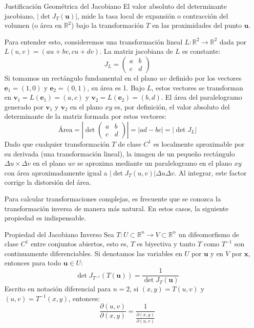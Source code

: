\documentclass[11pt,a4paper]{article}
\begin{document}
\begin{observacionbox}{Justificación Geométrica del Jacobiano}
El valor absoluto del determinante jacobiano, $|\det J_T(\mathbf{u})|$, mide la tasa local de expansión o contracción del volumen (o área en $\mathbb{R}^2$) bajo la transformación $T$ en las proximidades del punto $\mathbf{u}$.

Para entender esto, consideremos una transformación lineal $L: \mathbb{R}^2 \to \mathbb{R}^2$ dada por $L(u,v) = (au+bv, cu+dv)$. La matriz jacobiana de $L$ es constante:
\begin{equation*}
J_L = \begin{pmatrix} a & b \\ c & d \end{pmatrix}
\end{equation*}
Si tomamos un rectángulo fundamental en el plano $uv$ definido por los vectores $\mathbf{e}_1 = (1,0)$ y $\mathbf{e}_2 = (0,1)$, su área es 1. Bajo $L$, estos vectores se transforman en $\mathbf{v}_1 = L(\mathbf{e}_1) = (a,c)$ y $\mathbf{v}_2 = L(\mathbf{e}_2) = (b,d)$. El área del paralelogramo generado por $\mathbf{v}_1$ y $\mathbf{v}_2$ en el plano $xy$ es, por definición, el valor absoluto del determinante de la matriz formada por estos vectores:
\begin{equation*}
\text{Área} = \left| \det \begin{pmatrix} a & b \\ c & d \end{pmatrix} \right| = |ad - bc| = |\det J_L|
\end{equation*}
Dado que cualquier transformación $T$ de clase $C^1$ es localmente aproximable por su derivada (una transformación lineal), la imagen de un pequeño rectángulo $\Delta u \times \Delta v$ en el plano $uv$ se aproxima mediante un paralelogramo en el plano $xy$ con área aproximadamente igual a $|\det J_T(u,v)| \Delta u \Delta v$. Al integrar, este factor corrige la distorsión del área.
\end{observacionbox}

Para calcular transformaciones complejas, es frecuente que se conozca la transformación inversa de manera más natural. En estos casos, la siguiente propiedad es indispensable.

\begin{teoremabox}{Propiedad del Jacobiano Inverso}
Sea $T: U \subset \mathbb{R}^n \to V \subset \mathbb{R}^n$ un difeomorfismo de clase $C^1$ entre conjuntos abiertos, esto es, $T$ es biyectiva y tanto $T$ como $T^{-1}$ son continuamente diferenciables. Si denotamos las variables en $U$ por $\mathbf{u}$ y en $V$ por $\mathbf{x}$, entonces para todo $\mathbf{u} \in U$:
\begin{equation*}
\det J_{T^{-1}}(T(\mathbf{u})) = \frac{1}{\det J_T(\mathbf{u})}
\end{equation*}
Escrito en notación diferencial para $n=2$, si $(x,y) = T(u,v)$ y $(u,v) = T^{-1}(x,y)$, entonces:
\begin{equation*}
\frac{\partial(u,v)}{\partial(x,y)} = \frac{1}{\frac{\partial(x,y)}{\partial(u,v)}}
\end{equation*}
\end{teoremabox}
\end{document}
